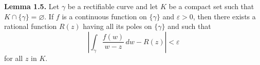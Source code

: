 \textbf{Lemma 1.5.} Let $\gamma$ be a rectifiable curve and let $K$ be a compact set such that $K \cap \{\gamma\} = \varnothing$. If $f$ is a continuous function on $\{\gamma\}$ and $\varepsilon > 0$, then there exists a rational function $R(z)$ having all its poles on $\{\gamma\}$ and such that
$$\left| \int_{\gamma} \frac{f(w)}{w-z} \, dw - R(z) \right| < \varepsilon$$
for all $z$ in $K$.
